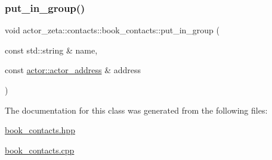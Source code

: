 \mbox{\label{classactor__zeta_1_1contacts_1_1book__contacts_a6f0ffb15b767f92dd0b0dd909542d42a}} 
\subsubsection{\texorpdfstring{put\+\_\+in\+\_\+group()}{put\_in\_group()}}
{\footnotesize\ttfamily void actor\+\_\+zeta\+::contacts\+::book\+\_\+contacts\+::put\+\_\+in\+\_\+group (\begin{DoxyParamCaption}\item[{const std\+::string \&}]{name,  }\item[{const \hyperlink{classactor__zeta_1_1actor_1_1actor__address}{actor\+::actor\+\_\+address} \&}]{address }\end{DoxyParamCaption})}



The documentation for this class was generated from the following files\+:\begin{DoxyCompactItemize}
\item 
\hyperlink{book__contacts_8hpp}{book\+\_\+contacts.\+hpp}\item 
\hyperlink{book__contacts_8cpp}{book\+\_\+contacts.\+cpp}\end{DoxyCompactItemize}
